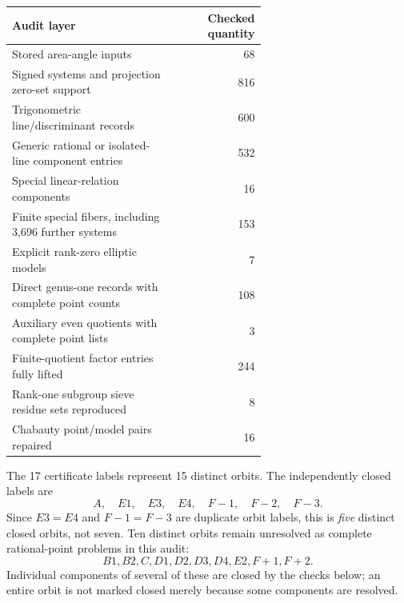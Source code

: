 \documentclass[11pt]{article}
\theoremstyle{remark}\newtheorem{remark}[theorem]{Remark}
\begin{document}
\begin{center}
\small\renewcommand{\arraystretch}{1.14}
\begin{tabular}{p{0.63\linewidth}r}
\toprule
Audit layer & Checked quantity\\
\midrule
Stored area-angle inputs & 68\\
Signed systems and projection zero-set support & 816\\
Trigonometric line/discriminant records & 600\\
Generic rational or isolated-line component entries & 532\\
Special linear-relation components & 16\\
Finite special fibers, including 3,696 further systems & 153\\
Explicit rank-zero elliptic models & 7\\
Direct genus-one records with complete point counts & 108\\
Auxiliary even quotients with complete point lists & 3\\
Finite-quotient factor entries fully lifted & 244\\
Rank-one subgroup sieve residue sets reproduced & 8\\
Chabauty point/model pairs repaired & 16\\
\bottomrule
\end{tabular}
\end{center}

The 17 certificate labels represent 15 distinct orbits. The independently closed labels are
\[
A,\quad E1,\quad E3,\quad E4,\quad F{-}1,\quad F{-}2,\quad F{-}3.
\]
Since $E3=E4$ and $F{-}1=F{-}3$ are duplicate orbit labels, this is \emph{five} distinct closed orbits, not seven. Ten distinct orbits remain unresolved as complete rational-point problems in this audit:
\[
B1,B2,C,D1,D2,D3,D4,E2,F{+}1,F{+}2.
\]
Individual components of several of these are closed by the checks below; an entire orbit is not marked closed merely because some components are resolved.
\end{document}
